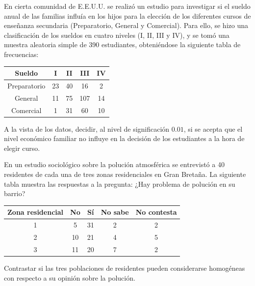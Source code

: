 \begin{ejercicio}
    En cierta comunidad de E.E.U.U. se realizó un estudio para investigar si el sueldo anual de las familias influía en los hijos para la elección de los diferentes cursos de enseñanza secundaria (Preparatorio, General y Comercial). Para ello, se hizo una clasificación de los sueldos en cuatro niveles (I, II, III y IV), y se tomó una muestra aleatoria simple de 390 estudiantes, obteniéndose la siguiente tabla de frecuencias:
    \begin{table}[H]
    \centering
    \begin{tabular}{|c|c|c|c|c|}
        \hline
        Sueldo & I & II & III & IV \\
        \hline
        Preparatorio & 23 & 40 & 16 & 2 \\
        \hline
        General & 11 & 75 & 107 & 14 \\
        \hline
        Comercial & 1 & 31 & 60 & 10 \\
        \hline
    \end{tabular}
    \end{table}
    \noindent
    A la vista de los datos, decidir, al nivel de significación $0.01$, si se acepta que el nivel económico familiar no influye en la decisión de los estudiantes a la hora de elegir curso.
\end{ejercicio}

\begin{ejercicio}
    En un estudio sociológico sobre la polución atmosférica se entrevistó a 40 residentes de cada una de tres zonas residenciales en Gran Bretaña. La siguiente tabla muestra las respuestas a la pregunta: ¿Hay problema de polución en su barrio?
    \begin{table}[H]
    \centering
    \begin{tabular}{|c|c|c|c|c|}
        \hline
        Zona residencial & No & Sí & No sabe & No contesta \\
        \hline
        1 & 5 & 31 & 2 & 2 \\
        \hline
        2 & 10 & 21 & 4 & 5 \\
        \hline
        3 & 11 & 20 & 7 & 2 \\
        \hline
    \end{tabular}
    \end{table}
    \noindent
    Contrastar si las tres poblaciones de residentes pueden considerarse homogéneas con respecto a su opinión sobre la polución.
\end{ejercicio}


